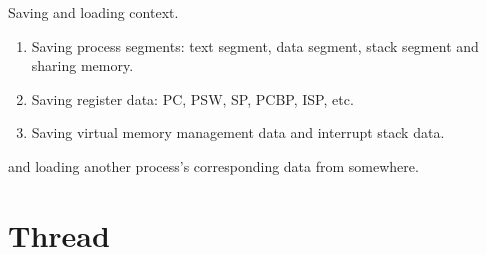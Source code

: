 \begin{enumerate}
    Saving and loading context.

    \begin{enumerate}
        \item Saving process segments: text segment, data segment, stack segment and sharing memory.
        \item Saving register data: PC, PSW, SP, PCBP, ISP, etc.
        \item Saving virtual memory management data and interrupt stack data.        
    \end{enumerate}
    
    and loading another process's corresponding data from somewhere.
    
\end{enumerate}



\chapter{Thread}

